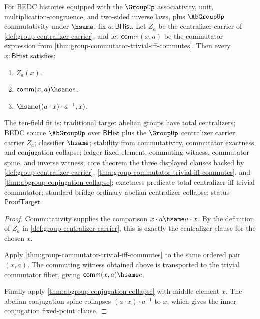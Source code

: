 \begin{theorem}
\label{thm:abgroup-centralizer-commutator-collapse}
For BEDC histories equipped with the $\GroupUp$ associativity, unit,
multiplication-congruence, and two-sided inverse laws, plus $\AbGroupUp$
commutativity under $\hsame$, fix $a:\mathsf{BHist}$. Let $Z_a$ be the
centralizer carrier of \autoref{def:group-centralizer-carrier}, and let
$\mathsf{comm}(x,a)$ be the commutator expression from
\autoref{thm:group-commutator-trivial-iff-commutes}. Then every
$x:\mathsf{BHist}$ satisfies:
\begin{enumerate}
\item $Z_a(x)$.
\item $\mathsf{comm}(x,a)\hsame e$.
\item $\hsame((a\cdot x)\cdot a^{-1},x)$.
\end{enumerate}
The ten-field fit is: traditional target abelian groups have total
centralizers; BEDC source $\AbGroupUp$ over $\mathsf{BHist}$ plus the
$\GroupUp$ centralizer carrier; carrier $Z_a$; classifier $\hsame$; stability
from commutativity, commutator exactness, and conjugation collapse; ledger
fixed element, commuting witness, commutator spine, and inverse witness; core
theorem the three displayed clauses backed by
\autoref{def:group-centralizer-carrier},
\autoref{thm:group-commutator-trivial-iff-commutes}, and
\autoref{thm:abgroup-conjugation-collapse}; exactness predicate total
centralizer iff trivial commutator; standard bridge ordinary abelian
centralizer collapse; status $\mathsf{ProofTarget}$.
\end{theorem}
\begin{proof}
Commutativity supplies the comparison $x\cdot a\hsame a\cdot x$. By the
definition of $Z_a$ in \autoref{def:group-centralizer-carrier}, this is exactly
the centralizer clause for the chosen $x$.

Apply \autoref{thm:group-commutator-trivial-iff-commutes} to the same ordered
pair $(x,a)$. The commuting witness obtained above is transported to the
trivial commutator fiber, giving $\mathsf{comm}(x,a)\hsame e$.

Finally apply \autoref{thm:abgroup-conjugation-collapse} with middle element
$x$. The abelian conjugation spine collapses $(a\cdot x)\cdot a^{-1}$ to $x$,
which gives the inner-conjugation fixed-point clause.
\end{proof}

